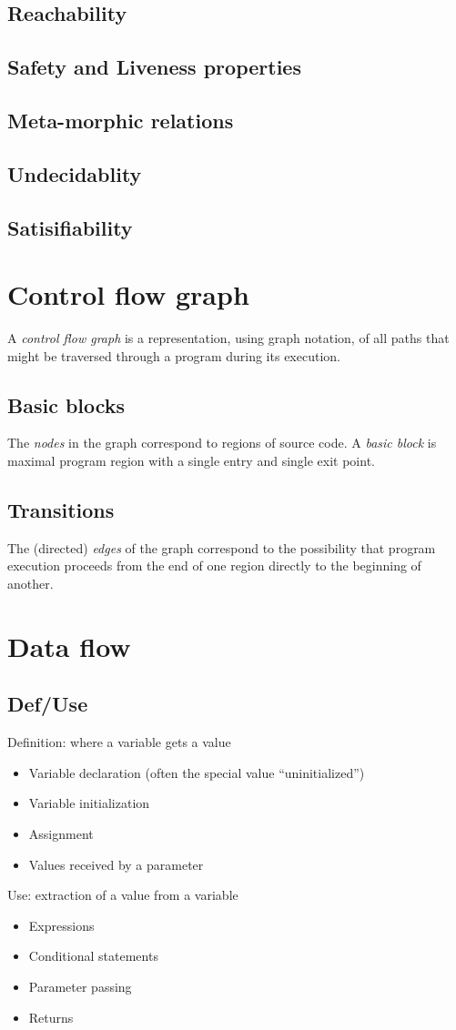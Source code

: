 \documentclass{article}
\begin{document}
\subsection{Reachability} 
\subsection{Safety and Liveness properties} 
\subsection{Meta-morphic relations} 
\subsection{Undecidablity} 
\subsection{Satisifiability} 

\section{Control flow graph} 
A \emph{control flow graph} is a representation, using graph notation, of all paths that might be traversed through a program during its execution.
\subsection{Basic blocks}
The \emph{nodes} in the graph correspond to regions of source code. A \emph{basic block} is maximal program region with a single entry and single exit point.
\subsection{Transitions} 
The (directed) \emph{edges} of the graph correspond to the possibility that program execution proceeds from the end of one region directly to the beginning of another.
 
\section{Data flow}
\subsection{Def/Use}
Definition: where a variable gets a value
\begin{itemize}[nosep]
    \item Variable declaration  (often the special value “uninitialized”)
    \item Variable initialization
    \item Assignment
    \item Values received by a parameter 
\end{itemize}
Use: extraction of a value from a variable
\begin{itemize}[nosep]
    \item Expressions
    \item Conditional statements
    \item Parameter passing
    \item Returns
\end{itemize}
\end{document}
